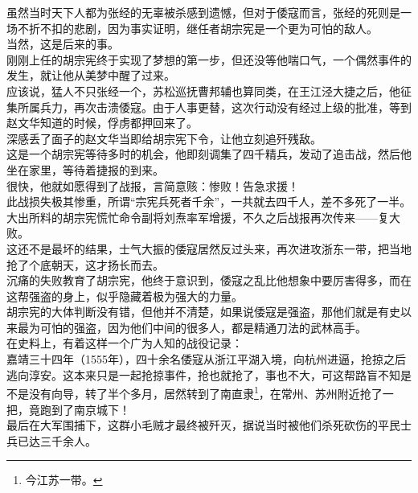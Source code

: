 \begin{multicols}{\theparacolNo}
虽然当时天下人都为张经的无辜被杀感到遗憾，但对于倭寇而言，张经的死则是一场不折不扣的悲剧，因为事实证明，继任者胡宗宪是一个更为可怕的敌人。\\

当然，这是后来的事。\\

刚刚上任的胡宗宪终于实现了梦想的第一步，但还没等他喘口气，一个偶然事件的发生，就让他从美梦中醒了过来。\\

应该说，猛人不只张经一个，苏松巡抚曹邦辅也算同类，在王江泾大捷之后，他征集所属兵力，再次击溃倭寇。由于人事更替，这次行动没有经过上级的批准，等到赵文华知道的时候，俘虏都押回来了。\\

深感丢了面子的赵文华当即给胡宗宪下令，让他立刻追歼残敌。\\

这是一个胡宗宪等待多时的机会，他即刻调集了四千精兵，发动了追击战，然后他坐在家里，等待着捷报的到来。\\

很快，他就如愿得到了战报，言简意赅：惨败！告急求援！\\

此战损失极其惨重，所谓“宗宪兵死者千余”，一共就去四千人，差不多死了一半。大出所料的胡宗宪慌忙命令副将刘焘率军增援，不久之后战报再次传来——复大败。\\

这还不是最坏的结果，士气大振的倭寇居然反过头来，再次进攻浙东一带，把当地抢了个底朝天，这才扬长而去。\\

沉痛的失败教育了胡宗宪，他终于意识到，倭寇之乱比他想象中要厉害得多，而在这帮强盗的身上，似乎隐藏着极为强大的力量。\\

胡宗宪的大体判断没有错，但他并不清楚，如果说倭寇是强盗，那他们就是有史以来最为可怕的强盗，因为他们中间的很多人，都是精通刀法的武林高手。\\

在史料上，有着这样一个广为人知的战役记录：\\

嘉靖三十四年（1555年），四十余名倭寇从浙江平湖入境，向杭州进逼，抢掠之后逃向淳安。这本来只是一起抢掠事件，抢也就抢了，事也不大，可这帮路盲不知是不是没有向导，转了半个多月，居然转到了南直隶\footnote{今江苏一带。}，在常州、苏州附近抢了一把，竟跑到了南京城下！\\

最后在大军围捕下，这群小毛贼才最终被歼灭，据说当时被他们杀死砍伤的平民士兵已达三千余人。\\


\end{multicols}
